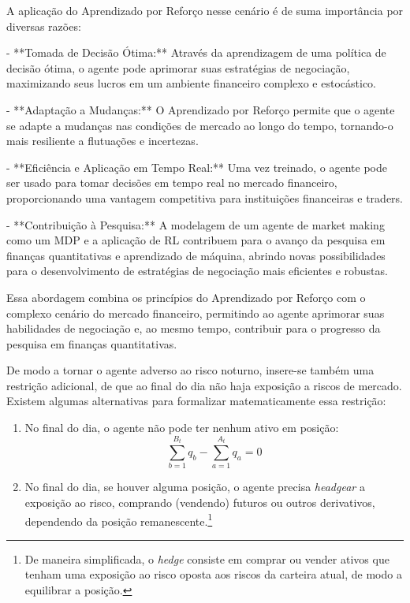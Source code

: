A aplicação do Aprendizado por Reforço nesse cenário é de suma importância por diversas razões:

- **Tomada de Decisão Ótima:** Através da aprendizagem de uma política de decisão ótima, o agente pode aprimorar suas estratégias de negociação, maximizando seus lucros em um ambiente financeiro complexo e estocástico.

- **Adaptação a Mudanças:** O Aprendizado por Reforço permite que o agente se adapte a mudanças nas condições de mercado ao longo do tempo, tornando-o mais resiliente a flutuações e incertezas.

- **Eficiência e Aplicação em Tempo Real:** Uma vez treinado, o agente pode ser usado para tomar decisões em tempo real no mercado financeiro, proporcionando uma vantagem competitiva para instituições financeiras e traders.

- **Contribuição à Pesquisa:** A modelagem de um agente de market making como um MDP e a aplicação de RL contribuem para o avanço da pesquisa em finanças quantitativas e aprendizado de máquina, abrindo novas possibilidades para o desenvolvimento de estratégias de negociação mais eficientes e robustas.

Essa abordagem combina os princípios do Aprendizado por Reforço com o complexo cenário do mercado financeiro, permitindo ao agente aprimorar suas habilidades de negociação e, ao mesmo tempo, contribuir para o progresso da pesquisa em finanças quantitativas.

De modo a tornar o agente adverso ao risco noturno, insere-se também uma restrição adicional, de que ao final do dia não haja exposição a riscos de mercado. 
Existem algumas alternativas para formalizar matematicamente essa restrição:
\begin{enumerate}
    \item No final do dia, o agente não pode ter nenhum ativo em posição: 
    \begin{equation}
        \sum_{b=1}^{B_t} q_b  - \sum_{a=1}^{A_t} q_a = 0\label{eq:eod_restriction}
    \end{equation}
    \item No final do dia, se houver alguma posição, o agente precisa \textit{headgear} a exposição ao risco, comprando (vendendo) futuros ou outros derivativos, dependendo da posição remanescente.\footnote{De maneira simplificada, o \textit{hedge} consiste em comprar ou vender ativos que tenham uma exposição ao risco oposta aos riscos da carteira atual, de modo a equilibrar a posição.}
\end{enumerate}

